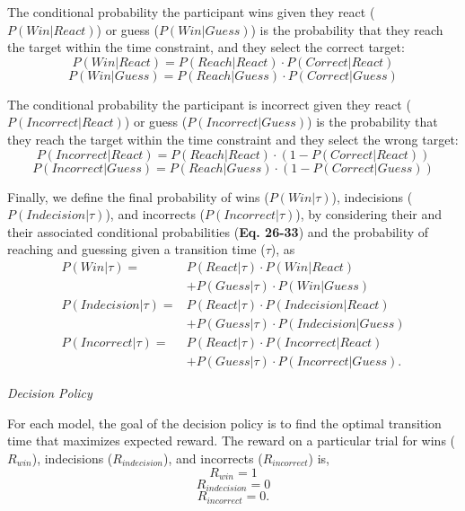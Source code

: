 \documentclass[12pt]{article}
\newcommand\boldblue[1]{\textcolor{mydarkblue}{\textbf{#1}}}
\begin{document}
The conditional probability the participant wins given they react ($P(Win|React)$) or guess ($P(Win|Guess)$) is the probability that they reach the target within the time constraint, and they select the correct target:
\begin{equation}
    P(Win|React) = P(Reach|React) \cdot P(Correct|React)
\end{equation}
\begin{equation}
    P(Win|Guess) = P(Reach|Guess) \cdot P(Correct|Guess)
\end{equation}

The conditional probability the participant is incorrect given they react ($P(Incorrect|React)$) or guess ($P(Incorrect|Guess)$) is the probability that they reach the target within the time constraint and they select the wrong target:
\begin{equation}
    P(Incorrect|React) = P(Reach|React) \cdot (1 - P(Correct|React))
\end{equation}
\begin{equation}
    P(Incorrect|Guess) = P(Reach|Guess) \cdot (1 - P(Correct|Guess))
\end{equation}

Finally, we define the final probability of wins ($P(Win|\tau)$), indecisions ($P(Indecision|\tau)$), and incorrects ($P(Incorrect|\tau)$), by considering their and their associated conditional probabilities (\boldblue{Eq. 26-33}) and the probability of reaching and guessing given a transition time ($\tau$), as
\begin{align}
    P(Win|\tau)        = & P(React|\tau) \cdot P(Win|React) \nonumber        \\ &+  P(Guess|\tau) \cdot P(Win|Guess)\\
    P(Indecision|\tau) = & P(React|\tau) \cdot P(Indecision|React) \nonumber \\ &+ P(Guess|\tau) \cdot P(Indecision|Guess) \\
    P(Incorrect|\tau)  = & P(React|\tau) \cdot P(Incorrect|React) \nonumber  \\ &+ P(Guess|\tau) \cdot P(Incorrect|Guess).
\end{align}

\vspace{2mm}
\noindent\emph{Decision Policy}

\noindent For each model, the goal of the decision policy is to find the optimal transition time that maximizes expected reward. The reward on a particular trial for wins ($R_{win}$), indecisions ($R_{indecision}$), and incorrects ($R_{incorrect}$) is,
\begin{equation}
    R_{win} = 1
\end{equation}
\begin{equation}
    R_{indecision} = 0
\end{equation}
\begin{equation}
    R_{incorrect} = 0.
\end{equation}
\end{document}
